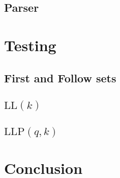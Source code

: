 \documentclass[a4paper,12pt]{article}
\newcommand\LL{\text{LL}}
\newcommand\LLP{\text{LLP}}
\theoremstyle{definition}
\begin{document}
\subsection{Parser}


\section{Testing}
\subsection{First and Follow sets}


\subsection{\texorpdfstring{$\LL(k)$}{TEXT}}


\subsection{\texorpdfstring{$\LLP(q,k)$}{TEXT}}



\section{Conclusion}


\printbibliography
\end{document}
